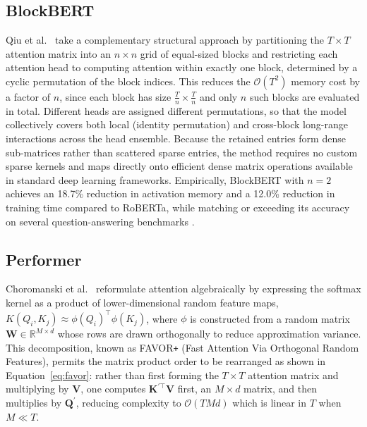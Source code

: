\subsection{BlockBERT}
\label{subsec:blockbert}

Qiu et al.\ \cite{qiu2020blockwise} take a complementary structural approach by
partitioning the $T \times T$ attention matrix into an $n \times n$ grid of
equal-sized blocks and restricting each attention head to computing attention
within exactly one block, determined by a cyclic permutation of the block
indices. This reduces the $\mathcal{O}(T^2)$ memory cost by a factor of
$n$, since each block has size $\frac{T}{n} \times \frac{T}{n}$ and only
$n$ such blocks are evaluated in total. Different heads are assigned
different permutations, so that the model collectively covers both local
(identity permutation) and cross-block long-range interactions across the
head ensemble. Because the retained entries form dense sub-matrices rather
than scattered sparse entries, the method requires no custom sparse kernels
and maps directly onto efficient dense matrix operations available in
standard deep learning frameworks. Empirically, BlockBERT with $n = 2$
achieves an 18.7\% reduction in activation memory and a 12.0\% reduction in
training time compared to RoBERTa, while matching or exceeding its accuracy
on several question-answering benchmarks \cite{qiu2020blockwise}.

\subsection{Performer}
\label{subsec:performer}

Choromanski et al.\ \cite{choromanski2021performer} reformulate attention algebraically
by expressing the softmax kernel as a product of lower-dimensional random
feature maps, $K(Q_i, K_j) \approx \phi(Q_i)^\top \phi(K_j)$, where $\phi$
is constructed from a random matrix $\mathbf{W} \in \mathbb{R}^{M \times d}$
whose rows are drawn orthogonally to reduce approximation variance. This
decomposition, known as FAVOR\texttt{+} (Fast Attention Via Orthogonal
Random Features), permits the matrix product order to be rearranged as shown
in Equation~\ref{eq:favor}: rather than first forming the $T \times T$
attention matrix and multiplying by $\mathbf{V}$, one computes
$\mathbf{K}^{\prime\top}\mathbf{V}$ first, an $M \times d$ matrix, and then
multiplies by $\mathbf{Q}^\prime$, reducing complexity to $\mathcal{O}(TMd)$
which is linear in $T$ when $M \ll T$.

